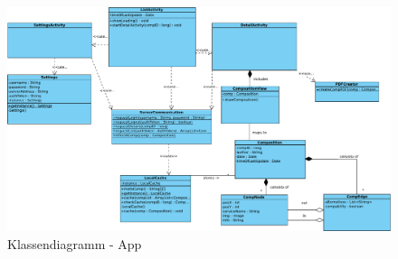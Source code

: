 \begin{figure}[h]
	\centering
	\includegraphics[width=\textwidth]{Klassendiagramm_App/Class_Diagram1}
	\caption{Klassendiagramm - App}
	\label{fig:klassendiagramm-a}
\end{figure}

